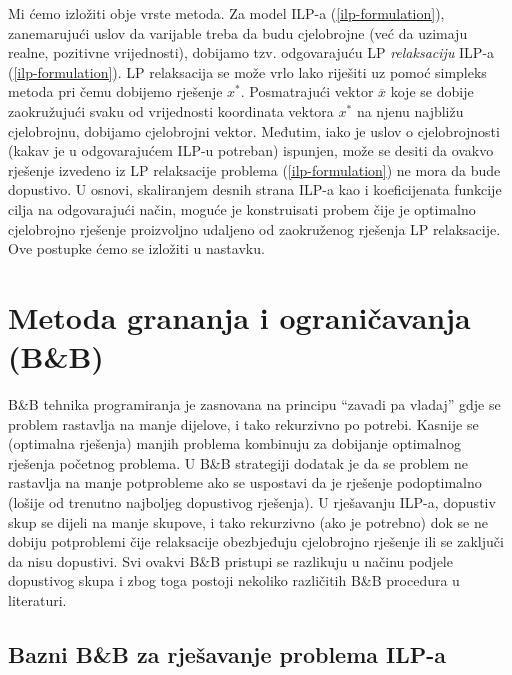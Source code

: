 \documentclass[a4paper, utf8, 11pt, colorlinks]{book}
\begin{document}
Mi ćemo izložiti   obje vrste metoda. Za model ILP-a (\ref{ilp-formulation}), zanemarujući uslov da varijable treba da budu cjelobrojne (već da uzimaju realne, pozitivne vrijednosti), dobijamo tzv. odgovarajuću LP \emph{relaksaciju} ILP-a (\ref{ilp-formulation}). LP relaksacija se može vrlo lako riješiti uz pomoć simpleks metoda pri čemu dobijemo rješenje $x^*$. Posmatrajući vektor $\overline{x}$ koje se dobije zaokružujući svaku od vrijednosti koordinata vektora $x^*$ na njenu najbližu cjelobrojnu, dobijamo cjelobrojni vektor. Međutim, iako je uslov o cjelobrojnosti (kakav je u odgovarajućem ILP-u potreban) ispunjen, može se desiti da ovakvo rješenje izvedeno iz LP relaksacije problema (\ref{ilp-formulation}) ne mora da bude dopustivo. U osnovi, skaliranjem desnih strana ILP-a kao i koeficijenata funkcije cilja na odgovarajući način, moguće je konstruisati probem čije je optimalno cjelobrojno rješenje proizvoljno udaljeno od zaokruženog rješenja LP relaksacije. Ove postupke ćemo se izložiti u nastavku. 

\section{Metoda grananja i ograničavanja (B\&B)}
B\&B tehnika programiranja je zasnovana na principu ``zavadi pa vladaj'' gdje se problem rastavlja na manje dijelove, i tako rekurzivno po potrebi. Kasnije se (optimalna rješenja) manjih problema kombinuju za dobijanje optimalnog rješenja početnog problema.  U B\&B strategiji dodatak je da se 
problem ne rastavlja na manje potprobleme ako se uspostavi da je rješenje podoptimalno (lošije od trenutno najboljeg dopustivog rješenja). U rješavanju ILP-a, dopustiv skup se dijeli na manje skupove, i tako rekurzivno (ako je potrebno) dok se ne dobiju potproblemi čije relaksacije obezbjeđuju cjelobrojno rješenje ili se zaključi da nisu dopustivi. Svi ovakvi B\&B pristupi se razlikuju u načinu podjele dopustivog skupa i zbog toga   postoji nekoliko različitih B\&B procedura u literaturi. 

\subsection{Bazni B\&B za rješavanje problema ILP-a}
\end{document}
